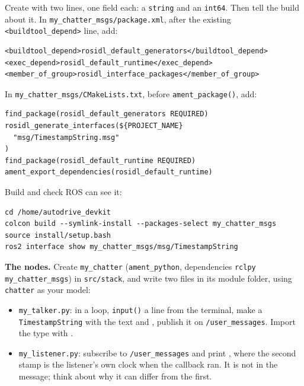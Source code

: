 \documentclass[11pt,a4paper]{article}
\begin{document}
Create  with two lines, one field each: a
\texttt{string} and an \texttt{int64}. Then tell the build about it. In
\texttt{my\_chatter\_msgs/package.xml}, after the existing \texttt{<buildtool\_depend>} line, add:

\begin{lstlisting}
<buildtool_depend>rosidl_default_generators</buildtool_depend>
<exec_depend>rosidl_default_runtime</exec_depend>
<member_of_group>rosidl_interface_packages</member_of_group>
\end{lstlisting}

In \texttt{my\_chatter\_msgs/CMakeLists.txt}, before \texttt{ament\_package()}, add:

\begin{lstlisting}
find_package(rosidl_default_generators REQUIRED)
rosidl_generate_interfaces(${PROJECT_NAME}
  "msg/TimestampString.msg"
)
find_package(rosidl_default_runtime REQUIRED)
ament_export_dependencies(rosidl_default_runtime)
\end{lstlisting}

Build and check ROS can see it:

\begin{lstlisting}
cd /home/autodrive_devkit
colcon build --symlink-install --packages-select my_chatter_msgs
source install/setup.bash
ros2 interface show my_chatter_msgs/msg/TimestampString
\end{lstlisting}

\textbf{The nodes.} Create \texttt{my\_chatter} (\texttt{ament\_python}, dependencies
\texttt{rclpy my\_chatter\_msgs}) in \texttt{src/stack}, and write two files in its module
folder, using \texttt{chatter} as your model:

\begin{itemize}
  \item \texttt{my\_talker.py}: in a loop, \texttt{input()} a line from the terminal, make a
  \texttt{TimestampString} with the text and ,
  publish it on \texttt{/user\_messages}. Import the type with
  .
  \item \texttt{my\_listener.py}: subscribe to \texttt{/user\_messages} and print
  , where the second stamp
  is the listener's own clock when the callback ran. It is not in the message; think about why
  it can differ from the first.
\end{itemize}
\end{document}
